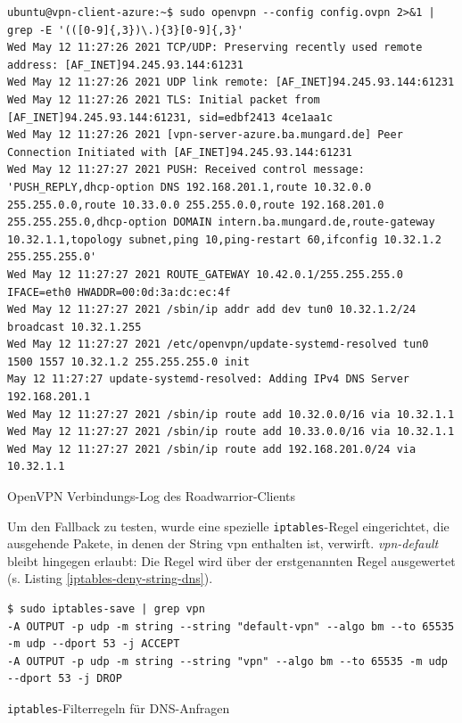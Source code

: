 \begin{listing}[h]
\begin{verbatim}
ubuntu@vpn-client-azure:~$ sudo openvpn --config config.ovpn 2>&1 | grep -E '(([0-9]{,3})\.){3}[0-9]{,3}'
Wed May 12 11:27:26 2021 TCP/UDP: Preserving recently used remote address: [AF_INET]94.245.93.144:61231
Wed May 12 11:27:26 2021 UDP link remote: [AF_INET]94.245.93.144:61231
Wed May 12 11:27:26 2021 TLS: Initial packet from [AF_INET]94.245.93.144:61231, sid=edbf2413 4ce1aa1c
Wed May 12 11:27:26 2021 [vpn-server-azure.ba.mungard.de] Peer Connection Initiated with [AF_INET]94.245.93.144:61231
Wed May 12 11:27:27 2021 PUSH: Received control message: 'PUSH_REPLY,dhcp-option DNS 192.168.201.1,route 10.32.0.0 255.255.0.0,route 10.33.0.0 255.255.0.0,route 192.168.201.0 255.255.255.0,dhcp-option DOMAIN intern.ba.mungard.de,route-gateway 10.32.1.1,topology subnet,ping 10,ping-restart 60,ifconfig 10.32.1.2 255.255.255.0'
Wed May 12 11:27:27 2021 ROUTE_GATEWAY 10.42.0.1/255.255.255.0 IFACE=eth0 HWADDR=00:0d:3a:dc:ec:4f
Wed May 12 11:27:27 2021 /sbin/ip addr add dev tun0 10.32.1.2/24 broadcast 10.32.1.255
Wed May 12 11:27:27 2021 /etc/openvpn/update-systemd-resolved tun0 1500 1557 10.32.1.2 255.255.255.0 init
May 12 11:27:27 update-systemd-resolved: Adding IPv4 DNS Server 192.168.201.1
Wed May 12 11:27:27 2021 /sbin/ip route add 10.32.0.0/16 via 10.32.1.1
Wed May 12 11:27:27 2021 /sbin/ip route add 10.33.0.0/16 via 10.32.1.1
Wed May 12 11:27:27 2021 /sbin/ip route add 192.168.201.0/24 via 10.32.1.1

\end{verbatim}
\caption{OpenVPN Verbindungs-Log des Roadwarrior-Clients}
\label{openvpn-connect-log}
\end{listing}\FloatBarrier
\newpage
Um den Fallback zu testen, wurde eine spezielle \texttt{\gls{iptables}}-Regel eingerichtet, die ausgehende Pakete, in denen der String \glqq vpn\grqq{} enthalten ist, verwirft. \textit{vpn-default} bleibt hingegen erlaubt: Die Regel wird über der erstgenannten Regel ausgewertet (s. Listing \ref{iptables-deny-string-dns}).
\begin{listing}[h]
\begin{verbatim}
$ sudo iptables-save | grep vpn
-A OUTPUT -p udp -m string --string "default-vpn" --algo bm --to 65535 -m udp --dport 53 -j ACCEPT
-A OUTPUT -p udp -m string --string "vpn" --algo bm --to 65535 -m udp --dport 53 -j DROP

\end{verbatim}
\caption{\texttt{iptables}-Filterregeln für DNS-Anfragen}
\label{iptables-deny-string-dns}
\end{listing}\FloatBarrier
